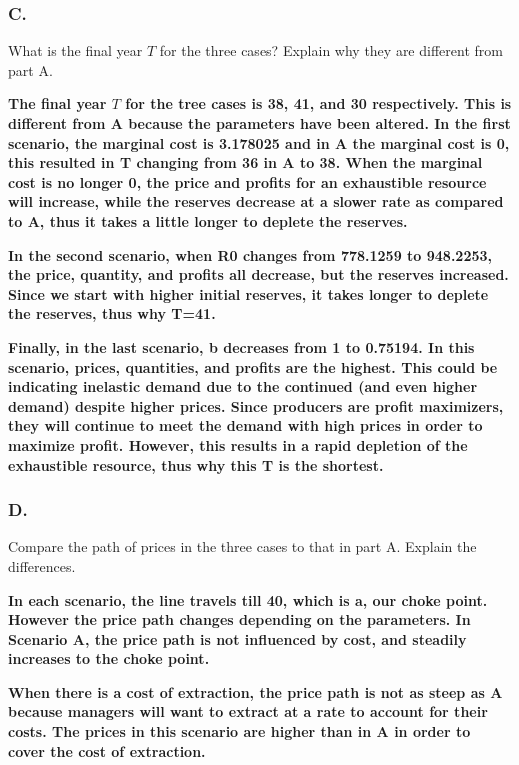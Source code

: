 \documentclass[
]{article}
\begin{document}
\hypertarget{c.}{%
\subsubsection{C.}\label{c.}}

What is the final year \(T\) for the three cases? Explain why they are
different from part A.

{\textbf{The final year \(T\) for the tree cases is 38, 41, and 30
respectively. This is different from A because the parameters have been
altered. In the first scenario, the marginal cost is 3.178025 and in A
the marginal cost is 0, this resulted in T changing from 36 in A to 38.
When the marginal cost is no longer 0, the price and profits for an
exhaustible resource will increase, while the reserves decrease at a
slower rate as compared to A, thus it takes a little longer to deplete
the reserves.}}

{\textbf{In the second scenario, when R0 changes from 778.1259 to
948.2253, the price, quantity, and profits all decrease, but the
reserves increased. Since we start with higher initial reserves, it
takes longer to deplete the reserves, thus why T=41.}}

{ \textbf{Finally, in the last scenario, b decreases from 1 to 0.75194.
In this scenario, prices, quantities, and profits are the highest. This
could be indicating inelastic demand due to the continued (and even
higher demand) despite higher prices. Since producers are profit
maximizers, they will continue to meet the demand with high prices in
order to maximize profit. However, this results in a rapid depletion of
the exhaustible resource, thus why this T is the shortest. }}

\hypertarget{d.}{%
\subsubsection{D.}\label{d.}}

Compare the path of prices in the three cases to that in part A. Explain
the differences.

{\textbf{In each scenario, the line travels till 40, which is a, our
choke point. However the price path changes depending on the parameters.
In Scenario A, the price path is not influenced by cost, and steadily
increases to the choke point.}}

{\textbf{When there is a cost of extraction, the price path is not as
steep as A because managers will want to extract at a rate to account
for their costs. The prices in this scenario are higher than in A in
order to cover the cost of extraction.}}
\end{document}
